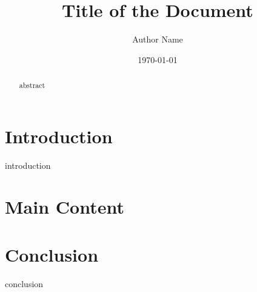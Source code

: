 \documentclass[11pt]{article}
\begin{document}
\title{Title of the Document}
\author{Author Name}
\date{\today}
\maketitle
\begin{abstract}
{{ abstract }}
\end{abstract}
\section{Introduction}
{{ introduction }}
\section{Main Content}
\section{Conclusion}
{{ conclusion }}
\begin{thebibliography}{9}
\end{thebibliography}
\end{document}
